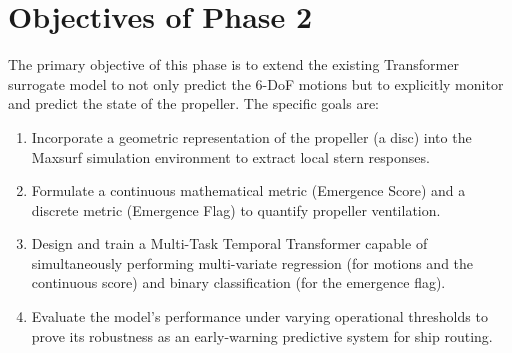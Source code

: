 \section{Objectives of Phase 2}
The primary objective of this phase is to extend the existing Transformer surrogate model to not only predict the 6-DoF motions but to explicitly monitor and predict the state of the propeller. The specific goals are:
\begin{enumerate}
    \item Incorporate a geometric representation of the propeller (a disc) into the Maxsurf simulation environment to extract local stern responses.
    \item Formulate a continuous mathematical metric (Emergence Score) and a discrete metric (Emergence Flag) to quantify propeller ventilation.
    \item Design and train a Multi-Task Temporal Transformer capable of simultaneously performing multi-variate regression (for motions and the continuous score) and binary classification (for the emergence flag).
    \item Evaluate the model's performance under varying operational thresholds to prove its robustness as an early-warning predictive system for ship routing.
\end{enumerate}
